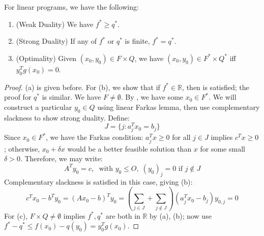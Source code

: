 \begin{prop}\label{prop:042-linear-strong-duality}For linear programs, we have the following:
	\begin{enumerate}[label=(\alph*)]
		\item (Weak Duality) We have $f^\ast\geq q^\ast$.
		\item (Strong Duality) If any of $f^\ast$ or $q^\ast$ is finite, $f^\ast=q^\ast$.
		\item (Optimality) Given $(x_0,y_0)\in F\times Q$, we have $(x_0,y_0)\in F^\ast\times Q^\ast$ iff $y_0^Tg(x_0)=0$.
	\end{enumerate}
\end{prop}

\begin{proof}
	(a) is given before. For (b), we show that if $f^\ast\in \mathbb{R}$, then  is satisfied; the proof for $q^\ast$ is similar. We have $F\neq \emptyset$. By , we have some $x_0\in F^\ast$. We will construct a particular $y_0\in Q$ using linear Farkas lemma, then use complementary slackness to show strong duality. Define:
	\[
		J=\{j:a_j^Tx_0=b_j\}
	\]
	Since $x_0\in F^\ast$, we have the Farkas condition: $a_j^Tx\geq 0$ for all $j\in J$ implies $c^Tx\geq 0$; otherwise, $x_0+\delta x$ would be a better feasible solution than $x$ for some small $\delta>0$. Therefore, we may write:
	\[
		A^Ty_0=c,\; \text{ with }y_0\leq O,\;(y_0)_j=0\text{ if }j\notin J
	\]
	Complementary slackness is satisfied in this case, giving (b):
	\[
		c^Tx_0-b^Ty_0=(Ax_0-b)^Ty_0=\left(\sum_{j\in J}+\sum_{j\notin J}\right)(a_j^Tx_0-b_j)y_{0,j}=0
	\]
	For (c), $F\times Q\neq\emptyset$ implies $f^\ast,q^\ast$ are both in $\mathbb{R}$ by (a), (b); now use $f^\ast-q^\ast\leq f(x_0)-q(y_0)=y_0^Tg(x_0)$.
\end{proof}


